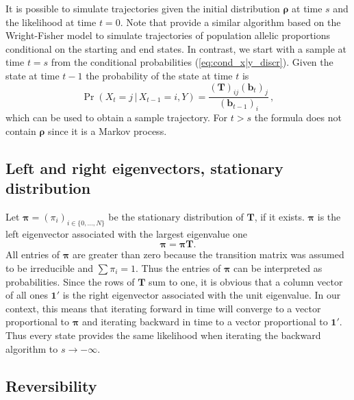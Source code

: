 \documentclass[preprint]{elsarticle}
\newcommand{\bs}[1]{\ensuremath{\boldsymbol{#1}}}
\newcommand\given{{\,|\,}}
\newcommand\x[1]{\ensuremath{X_{#1}}}
\newcommand\y{\ensuremath{Y}}
\newcommand\s{\ensuremath{s}}
\newcommand\oneC{\ensuremath{\mathbf{1}'}}
\newcommand\oneR{\ensuremath{\mathbf{1}}}
\begin{document}
It is possible to simulate trajectories given the initial distribution $\bs{\rho}$ at time $\s$ and the likelihood at time $t=0$. Note that \citet{Zhao14} provide a similar algorithm based on the Wright-Fisher model to simulate trajectories of population allelic proportions conditional on the starting and end states. In contrast, we start with a sample at time $t=\s$ from the conditional probabilities (\ref{eq:cond_x|y_discr}). Given the state at time $t-1$ the probability of the state at time $t$ is
\begin{equation}
    \Pr(\x{t}=j\given \x{t-1}=i,\y)=\frac{(\mathbf{T})_{ij}(\mathbf{b}_{t})_j}{(\mathbf{b}_{t-1})_i}\,,
\end{equation}
which can be used to obtain a sample trajectory. For $t>s$ the formula does not contain $\bs{\rho}$ since it is a Markov process.

\subsection{Left and right eigenvectors, stationary distribution}

Let $\bs{\pi} = (\pi_i)_{i \in \{0,\ldots,N\}}$ be the stationary distribution of $\mathbf{T}$, if it exists. $\bs{\pi}$ is the left eigenvector associated with the largest eigenvalue one~\citep[][p. 87]{Ewen04}
\begin{equation}\label{eq:stationary}
\bs{\pi}=\bs{\pi}\mathbf{T}.
\end{equation}
All entries of $\bs{\pi}$ are greater than zero because the transition matrix was assumed to be irreducible and $\sum \pi_i = 1$. Thus the entries of $\bs{\pi}$ can be interpreted as probabilities. Since the rows of $\mathbf{T}$ sum to one, it is obvious that a column vector of all ones $\oneC$ is the right eigenvector associated with the unit eigenvalue. In our context, this means that iterating forward in time will converge to a vector proportional to $\bs{\pi}$ and iterating backward in time to a vector proportional to $\oneC$. Thus every state provides the same likelihood when iterating the backward algorithm to $s\to-\infty$. %

\subsection{Reversibility}
\end{document}
